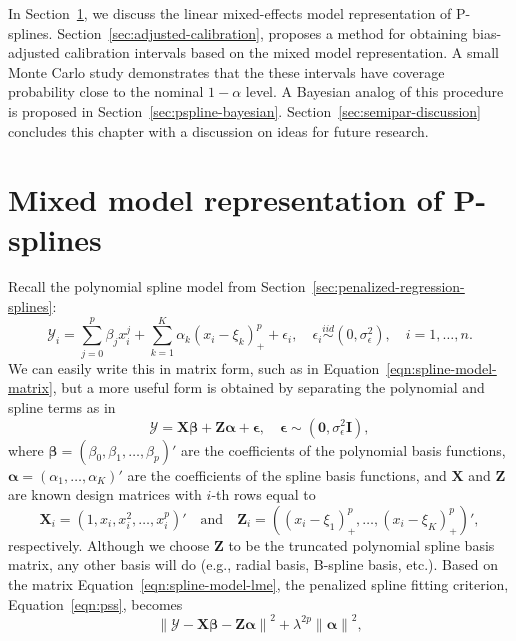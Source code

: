 \documentclass[cmfont,usenames,dvipsnames,leqno]{afit-etd}\usepackage[]{graphicx}\usepackage[]{color}
\newcommand{\norm}[1]{\left\|#1\right\|}
\newcommand{\bc}[1]{\ensuremath{\bm{\mathcal{#1}}}}
\newcommand{\mc}[1]{\ensuremath{\mathcal{#1}}}
\begin{document}
In Section~\ref{sec:pspline-lmm}, we discuss the linear mixed-effects model representation of \ac{P-spline}s. Section~\ref{sec:adjusted-calibration}, proposes a method for obtaining bias-adjusted calibration intervals based on the mixed model representation. A small Monte Carlo study demonstrates that the these intervals have coverage probability close to the nominal $1-\alpha$ level. A Bayesian analog of this procedure is proposed in Section~\ref{sec:pspline-bayesian}. Section~\ref{sec:semipar-discussion} concludes this chapter with a discussion on ideas for future research.

\section{Mixed model representation of P-splines}
\label{sec:pspline-lmm}
Recall the polynomial spline model from Section~\ref{sec:penalized-regression-splines}:
\begin{equation}
  \mc{Y}_i = \sum_{j = 0}^p\beta_jx_i^j + \sum_{k = 1}^K \alpha_k\left(x_i - \xi_k\right)_+^p + \epsilon_i, \quad \epsilon_i \stackrel{iid}{\sim} \left(0, \sigma_\epsilon^2\right), \quad i = 1, \dotsc, n.
\end{equation}
We can easily write this in matrix form, such as in Equation~\eqref{eqn:spline-model-matrix}, but a more useful form is obtained by separating the polynomial and spline terms as in
\begin{equation}
\label{eqn:spline-model-lme}
  \bc{Y} = \bm{X}\bm{\beta} + \bm{Z}\bm{\alpha} + \bm{\epsilon}, \quad \bm{\epsilon} \sim \left(\bm{0}, \sigma_\epsilon^2\bm{I}\right),
\end{equation}
where $\bm{\beta} = (\beta_0, \beta_1, \dotsc, \beta_p)'$ are the coefficients of the polynomial basis functions, $\bm{\alpha} = (\alpha_1, \dotsc, \alpha_K)'$ are the coefficients of the spline basis functions, and $\bm{X}$ and $\bm{Z}$ are known design matrices with $i$-th rows equal to
\begin{equation*}
\bm{X}_i = \left(1, x_i, x_i^2, \dotsc, x_i^p \right)' \quad \text{and} \quad  \bm{Z}_i = \left( (x_i - \xi_1)_+^p, \dotsc, (x_i - \xi_K)_+^p \right)',
\end{equation*}
respectively. Although we choose $\bm{Z}$ to be the truncated polynomial spline basis matrix, any other basis will do (e.g., radial basis, B-spline basis, etc.). Based on the matrix Equation~\eqref{eqn:spline-model-lme}, the penalized spline fitting criterion, Equation~\eqref{eqn:pss}, becomes
\begin{equation*}
  \norm{\bc{Y} - \bm{X}\bm{\beta} - \bm{Z}\bm{\alpha}}^2 + \lambda^{2p}\norm{\bm{\alpha}}^2,
\end{equation*}
\end{document}
